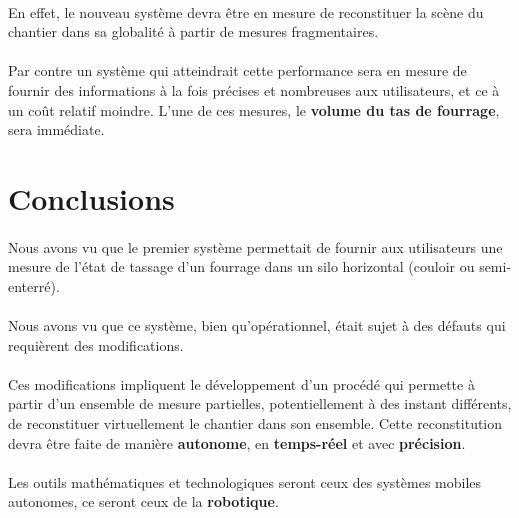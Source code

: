 \documentclass[12pt,a4paper]{report}
\begin{document}
\paragraph{} En effet, le nouveau système devra être en mesure de reconstituer la scène du chantier dans sa globalité à partir de mesures fragmentaires.

\paragraph{} Par contre un système qui atteindrait cette performance sera en mesure de fournir des informations à la fois précises et nombreuses aux utilisateurs, et ce à un coût relatif moindre. L'une de ces mesures, le \textbf{volume du tas de fourrage}, sera immédiate.
\newpage

\section{Conclusions}

\paragraph{}Nous avons vu que le premier système permettait de fournir aux utilisateurs une mesure de l'état de tassage d'un fourrage dans un silo horizontal (couloir ou semi-enterré).

\paragraph{}Nous avons vu que ce système, bien qu'opérationnel, était sujet à des défauts qui requièrent des modifications.

\paragraph{}Ces modifications impliquent le développement d'un procédé qui permette à partir d'un ensemble de mesure partielles, potentiellement à des instant différents, de reconstituer virtuellement le chantier dans son ensemble. Cette reconstitution devra être faite de manière \textbf{autonome}, en \textbf{temps-réel} et avec \textbf{précision}.

\paragraph{}Les outils mathématiques et technologiques seront ceux des systèmes mobiles autonomes, ce seront ceux de la \textbf{robotique}.
\end{document}

